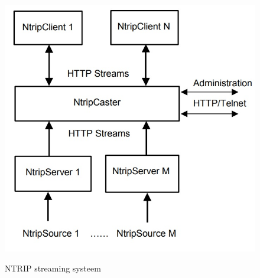 \begin{figure}[hpb]
	\includegraphics[scale=0.65]{NTRIP.jpg}
	\caption{NTRIP streaming systeem}
	\cite{LBibNTRIP}
	\label{imgNTRIP}
\end{figure} 
 



